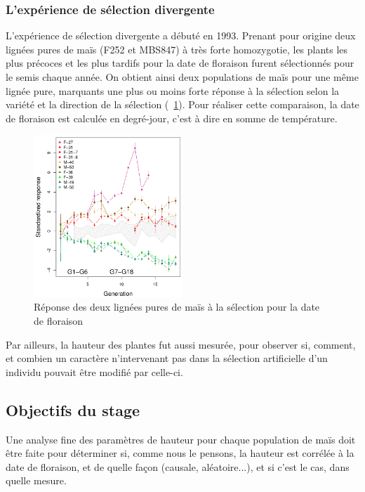 \documentclass[12pt,a4paper]{article}
\begin{document}
					
					\subsubsection{L'expérience de sélection divergente}
					
						L'expérience de sélection divergente a débuté en 1993. Prenant pour origine deux lignées pures de maïs (F252 et MBS847) à très forte homozygotie, les plants les plus précoces et les plus tardifs pour la date de floraison furent sélectionnés pour le semis chaque année. On obtient ainsi deux populations de maïs pour une même lignée pure, marquants une plus ou moins forte réponse à la sélection selon la variété et la direction de la sélection (~\ref{sélection}). Pour réaliser cette comparaison, la date de floraison est calculée en degré-jour, c'est à dire en somme de température.
						\begin{figure}
							\centering
							\includegraphics[width =0.5\textwidth]{selection.png}
							\caption{Réponse des deux lignées pures de maïs à la sélection pour la date de floraison}
							\label{sélection}
						\end{figure}
						
						Par ailleurs, la hauteur des plantes fut aussi mesurée, pour observer si, comment, et combien un caractère n'intervenant pas dans la sélection artificielle d'un individu pouvait être modifié par celle-ci.
					
				\subsection{Objectifs du stage}
				
					Une analyse fine des paramètres de hauteur pour chaque population de maïs doit être faite pour déterminer si, comme nous le pensons, la hauteur est corrélée à la date de floraison, et de quelle façon (causale, aléatoire...), et si c'est le cas, dans quelle mesure.
					
\end{document}
